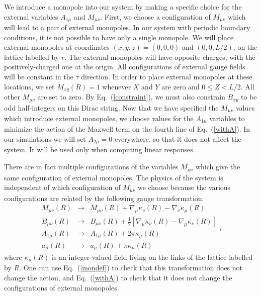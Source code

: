 \documentclass[prb,twocolumn]{revtex4-1}
\begin{document}
We introduce a monopole into our system by making a specific choice for the external variables $A_{1\mu}$ and $M_{\mu\nu}$. First, we choose a configuration of $M_{\mu\nu}$ which will lead to a pair of external monopoles. In our system with periodic boundary conditions, it is not possible to have only a single monopole. We will place external monopoles at coordinates $(x,y,z)=(0,0,0)$ and $(0,0,L/2)$, on the lattice labelled by $r$. The external monopoles will have opposite charges, with the positively-charged one at the origin. All configurations of external gauge fields will be constant in the $\tau$ direction. In order to place external monopoles at these locations, we set $M_{xy}(R)=1$ whenever $X$ and $Y$ are zero and $0\leq Z<L/2$. All other $M_{\mu\nu}$ are set to zero. By Eq.~(\ref{constraint}), we must also constrain $B_{xy}$ to be odd half-integers on this Dirac string. Now that we have specified the $M_{\mu\nu}$ values which introduce external monopoles, we choose values for the $A_{1\mu}$ variables to minimize the action of the Maxwell term on the fourth line of Eq.~(\ref{withA}). In our simulations we will set $A_{2\mu}=0$ everywhere, so that it does not affect the system. It will be used only when computing linear responses. 

There are in fact multiple configurations of the variables $M_{\mu\nu}$ which give the same configuration of external monopoles. The physics of the system is independent of which configuration of $M_{\mu\nu}$ we choose because the various configurations are related by the following gauge transformation:
\begin{equation}
\begin{array}{ccc}
M_{\mu\nu}(R)&\rightarrow&M_{\mu\nu}(R)+\nabla_\mu \kappa_\nu(R)-\nabla_\nu \kappa_\mu(R) \\
B_{\mu\nu}(R)&\rightarrow&B_{\mu\nu}(R)+\frac{1}{2}[\nabla_\mu \kappa_\nu(R)-\nabla_\mu \kappa_\nu(R)] \\
A_{1\mu}(R)&\rightarrow&A_{1\mu}(R)+2\pi \kappa_\mu(R)\\
a_\mu(R)&\rightarrow&a_\mu(R)+\pi \kappa_\mu(R)
\end{array},
\end{equation}
where $\kappa_\mu(R)$ is an integer-valued field living on the links of the lattice labelled by $R$. One can use Eq.~(\ref{mondef}) to check that this transformation does not change the action, and Eq.~(\ref{withA}) to check that it does not change the configurations of external monopoles.
\end{document}
